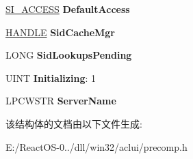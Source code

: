 \begin{DoxyCompactItemize}
\mbox{\label{struct___s_e_c_u_r_i_t_y___p_a_g_e_a83b832e9ffecfedce415f2dfaff7e3c2}} 
\hyperlink{struct___s_i___a_c_c_e_s_s}{S\+I\+\_\+\+A\+C\+C\+E\+SS} {\bfseries Default\+Access}
\item 
\mbox{\label{struct___s_e_c_u_r_i_t_y___p_a_g_e_a9af2c2657dc898014396badd506ed054}} 
\hyperlink{interfacevoid}{H\+A\+N\+D\+LE} {\bfseries Sid\+Cache\+Mgr}
\item 
\mbox{\label{struct___s_e_c_u_r_i_t_y___p_a_g_e_a7cd4f045166c6e3e44fc1585619fec29}} 
L\+O\+NG {\bfseries Sid\+Lookups\+Pending}
\item 
\mbox{\label{struct___s_e_c_u_r_i_t_y___p_a_g_e_a80a062f3d051b4e766f71a80b52f3538}} 
U\+I\+NT {\bfseries Initializing}\+: 1
\item 
\mbox{\label{struct___s_e_c_u_r_i_t_y___p_a_g_e_abe142dafcd04b89cad6c75bf5808b20c}} 
L\+P\+C\+W\+S\+TR {\bfseries Server\+Name}
\end{DoxyCompactItemize}


该结构体的文档由以下文件生成\+:\begin{DoxyCompactItemize}
\item 
E\+:/\+React\+O\+S-\/0../dll/win32/aclui/precomp.\+h\end{DoxyCompactItemize}
